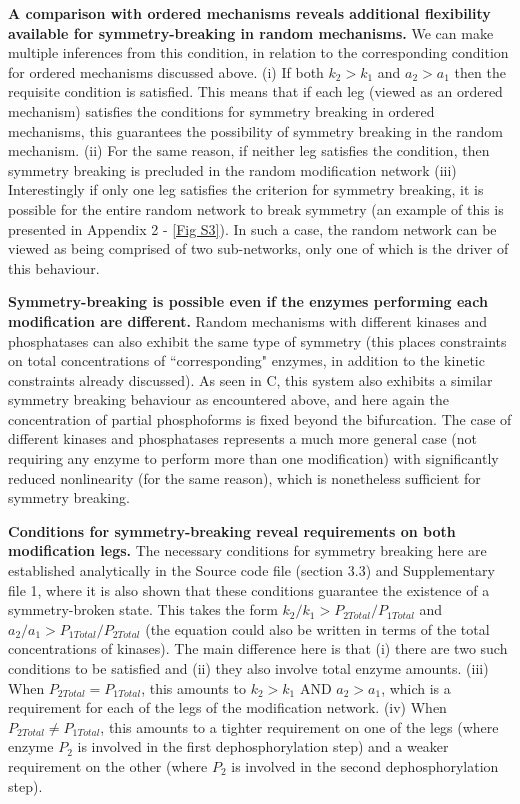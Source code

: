 \documentclass[9pt,lineno]{elife}
\begin{document}
{\bf A comparison with ordered mechanisms reveals additional flexibility available for symmetry-breaking in random mechanisms.} We can make multiple inferences from this condition, in relation to the corresponding condition for ordered mechanisms discussed above. (i) If both $k_2 > k_1$ and $a_2 > a_1$ then the requisite condition is satisfied. This means that if each leg (viewed as an ordered mechanism) satisfies the conditions for symmetry breaking in ordered mechanisms, this guarantees the possibility of symmetry breaking in the random mechanism.
(ii) For the same reason, if neither leg satisfies the condition, then symmetry breaking is precluded in the random modification network (iii) Interestingly if only one leg satisfies the criterion for symmetry breaking, it is possible for the entire random network to break symmetry (an example of this is presented in Appendix 2 - \cref{Fig S3}). In such a case, the random network can be viewed as being comprised of two sub-networks, only one of which is the driver of this behaviour. 

{\bf Symmetry-breaking is possible even if the enzymes performing each modification are different.} Random mechanisms with different kinases and phosphatases can also exhibit the same type of symmetry (this places constraints on total concentrations of ``corresponding" enzymes, in addition to the kinetic constraints already discussed). As seen in C, this system also exhibits a similar symmetry breaking behaviour as encountered above, and here again the concentration of partial phosphoforms is fixed beyond the bifurcation. The case of different kinases and phosphatases represents a much more general case (not requiring any enzyme to perform more than one modification) with significantly reduced nonlinearity (for the same reason), which is
nonetheless sufficient for symmetry breaking.

{\bf Conditions for symmetry-breaking reveal requirements on both modification legs.} The necessary conditions for  symmetry breaking here are established analytically in the Source code file (section 3.3) and Supplementary file 1, where it is also shown that these conditions guarantee the existence of a symmetry-broken state. This takes the form $k_2/k_1 > P_{2Total}/P_{1Total}$ and $a_2/a_1> P_{1Total}/P_{2Total}$ (the equation could also be written in terms of the total concentrations of kinases).
The main difference here is that (i) there are two such conditions to be satisfied and (ii) they also involve total enzyme amounts. (iii) When $P_{2Total}=P_{1Total}$, this amounts to $k_2>k_1$ AND
$a_2>a_1$, which is a requirement for each of the legs of the modification network. (iv) When $P_{2Total} \neq P_{1Total}$, this amounts to a tighter requirement on one of the legs (where enzyme $P_2$ is involved in the first dephosphorylation step) and a weaker requirement on the other (where $P_2$ is involved in the second dephosphorylation step).
\end{document}
